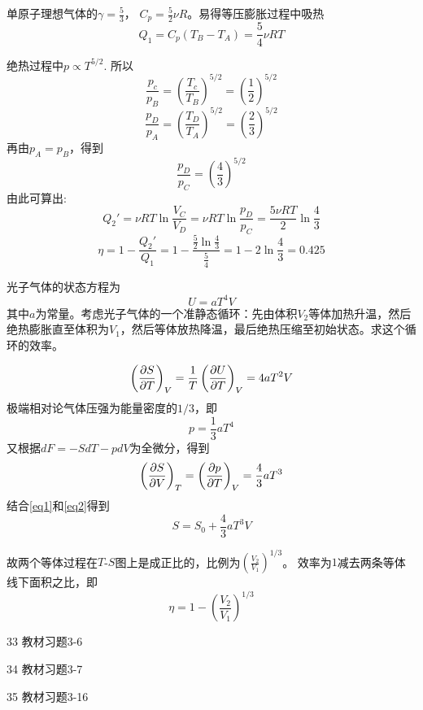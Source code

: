 \documentclass[CJK]{beamer}
\begin{document}
\begin{frame}
  \bch
  {\scriptsize
  单原子理想气体的$\gamma = \frac{5}{3}$， $C_p = \frac{5}{2}\nu R$。易得等压膨胀过程中吸热
  $$Q_1 = C_p(T_B-T_A) = \frac{5}{4}\nu R T$$

  绝热过程中$p \propto T^{5/2}$.
  所以
  $$\frac{p_c}{p_B} = \left(\frac{T_c}{T_B}\right)^{5/2} = \left(\frac{1}{2}\right)^{5/2}$$
  $$\frac{p_D}{p_A} =\left(\frac{T_D}{T_A}\right)^{5/2} = \left(\frac{2}{3}\right)^{5/2}$$
  再由$p_A=p_B$，得到
  $$\frac{p_D}{p_C} =   \left(\frac{4}{3}\right)^{5/2}$$
  由此可算出:
  $$ Q_2' = \nu R T \ln \frac{V_C}{V_D} = \nu R T \ln \frac{p_D}{p_C} = \frac{5\nu RT}{2} \ln\frac{4}{3} $$
  $$\eta = 1 - \frac{Q_2'}{Q_1} = 1 - \frac{\frac{5}{2}\ln\frac{4}{3}}{\frac{5}{4}} = 1-2\ln\frac{4}{3} = 0.425 $$
  }
  \ech
\end{frame}

\begin{frame}
  \chtitle{\proid (\sfour)}
  \bch
  光子气体的状态方程为
  $$ U = a T^4 V$$
  其中$a$为常量。考虑光子气体的一个准静态循环：先由体积$V_2$等体加热升温，然后绝热膨胀直至体积为$V_1$，然后等体放热降温，最后绝热压缩至初始状态。求这个循环的效率。
  \ech
\end{frame}


\begin{frame}
  \bch
  {\scriptsize

\begin{equation}
    \left(\frac{\partial S}{\partial T}\right)_{V} = \frac{1}{T}\left(\frac{\partial U}{\partial T}\right)_{V} = 4aT^2 V \label{eq1}
\end{equation}
极端相对论气体压强为能量密度的$1/3$，即
$$p = \frac{1}{3}aT^4$$
又根据$ dF = -SdT - pdV$为全微分，得到
\begin{equation}
  \left(\frac{\partial S}{\partial V}\right)_{T} = \left(\frac{\partial p}{\partial T}\right)_{V} = \frac{4}{3}aT^3 \label{eq2}
\end{equation}
  结合\eqref{eq1}和\eqref{eq2}得到
  $$ S = S_0 + \frac{4}{3} aT^3 V $$
  
  故两个等体过程在$T$-$S$图上是成正比的，比例为$\left(\frac{V_2}{V_1}\right)^{1/3}$。
  效率为$1$减去两条等体线下面积之比，即
  $$\eta = 1 - \left(\frac{V_2}{V_1}\right)^{1/3}$$
  }
  \ech
\end{frame}


\begin{frame}
  \bch
  \bitem
  \item[33]{教材习题3-6}
  \item[34]{教材习题3-7}
  \item[35]{教材习题3-16}
  \eitem
  \ech
\end{frame}
\end{document}
